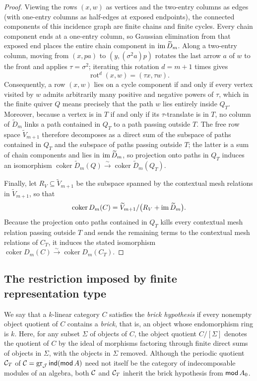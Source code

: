 \begin{proof}
Viewing the rows $(x,w)$ as vertices and the two-entry columns as edges (with
one-entry columns as half-edges at exposed endpoints), the connected
components of this incidence graph are finite chains and finite cycles. Every
chain component ends at a one-entry column, so Gaussian elimination from that
exposed end places the entire chain component in $\operatorname{im}\widetilde D_m$. Along a
two-entry column, moving from $(x,pa)$ to $(y,(\sigma^2 a)p)$ rotates the
last arrow $a$ of $w$ to the front and applies $\tau=\sigma^2$; iterating this
rotation $d=m+1$ times gives
\[
 \operatorname{rot}^d(x,w)=(\tau x,\tau w).
\]
Consequently, a row $(x,w)$ lies on a cycle component if and only if every
vertex visited by $w$ admits arbitrarily many positive and negative powers of
$\tau$, which in the finite quiver $Q$ means precisely that the path $w$ lies
entirely inside $Q_T$. Moreover, because a vertex is in $T$ if and only if
its $\tau$-translate is in $T$, no column of $\widetilde D_m$ links a path
contained in $Q_T$ to a path passing outside $T$. The free row space
$\widetilde V_{m+1}$ therefore decomposes as a direct sum of the subspace of
paths contained in $Q_T$ and the subspace of paths passing outside $T$; the
latter is a sum of chain components and lies in $\operatorname{im}\widetilde D_m$, so
projection onto paths in $Q_T$ induces an isomorphism
$\operatorname{coker}\widetilde D_m(Q)\xrightarrow{\sim}\operatorname{coker}\widetilde D_m(Q_T)$.

Finally, let $R_V\subseteq\widetilde V_{m+1}$ be the subspace spanned by the
contextual mesh relations in $\widetilde V_{m+1}$, so that
\[
 \operatorname{coker}D_m(C)=\widetilde V_{m+1}/\bigl(R_V+\operatorname{im}\widetilde D_m\bigr).
\]
Because the projection onto paths contained in $Q_T$ kills every contextual
mesh relation passing outside $T$ and sends the remaining terms to the
contextual mesh relations of $C_T$, it induces the stated isomorphism
$\operatorname{coker}D_m(C)\xrightarrow{\sim}\operatorname{coker}D_m(C_T)$.
\end{proof}

\subsection{The restriction imposed by finite representation type}
\label{subsec:brick-hypothesis}

We say that a $k$-linear category $C$ satisfies the \emph{brick hypothesis}
if every nonempty object quotient of $C$ contains a \emph{brick}, that is, an
object whose endomorphism ring is $k$. Here, for any subset $\Sigma$ of
objects of $C$, the object quotient $C/[\Sigma]$ denotes the quotient of $C$
by the ideal of morphisms factoring through finite direct sums of objects in
$\Sigma$, with the objects in $\Sigma$ removed. Although the periodic
quotient $\mathcal C_T$ of $\mathcal C=\operatorname{gr}_\mathcal J\operatorname{\mathsf{ind}}(\operatorname{\mathsf{mod}} A)$ need not itself be the category of
indecomposable modules of an algebra, both $\mathcal C$ and $\mathcal C_T$ inherit the brick
hypothesis from $\operatorname{\mathsf{mod}} A_0$.

